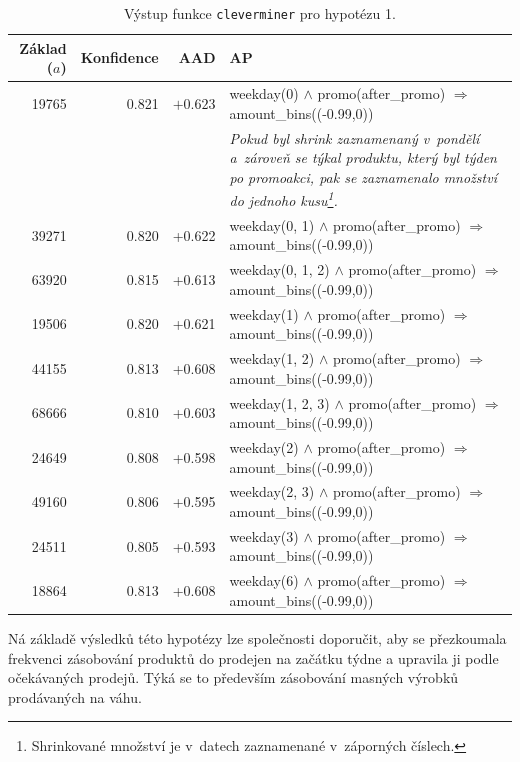     \begin{table}[h!]
        \begin{center}
                \captionsetup{justification=centering}
        \caption{Výstup funkce \texttt{cleverminer} pro hypotézu 1.}
        \begin{tabular}{rrrp{7.5cm}}
            Základ ($a$) & Konfidence & AAD & AP \\
            \midrule
19765 & 0.821 & $+0.623$ & weekday(0) $\land$ promo(after\_promo) $\Rightarrow$ amount\_bins((-0.99,0)) \\
& & & {\footnotesize{\textit{Pokud byl shrink zaznamenaný v~pondělí a~zároveň se týkal produktu, který byl týden po promoakci, pak se zaznamenalo množství do jednoho kusu\footnote{Shrinkované množství je v~datech zaznamenané v~záporných číslech.}. }}} \\
39271 & 0.820 & +0.622 & weekday(0, 1)  $\land$ promo(after\_promo) $\Rightarrow$ amount\_bins((-0.99,0)) \\
63920 & 0.815 & +0.613 & weekday(0, 1, 2)  $\land$ promo(after\_promo) $\Rightarrow$ amount\_bins((-0.99,0)) \\
19506 & 0.820 & +0.621 & weekday(1)  $\land$ promo(after\_promo) $\Rightarrow$ amount\_bins((-0.99,0)) \\
44155 & 0.813 & +0.608 & weekday(1, 2)  $\land$ promo(after\_promo) $\Rightarrow$ amount\_bins((-0.99,0)) \\
68666 & 0.810 & +0.603 & weekday(1, 2, 3)  $\land$ promo(after\_promo) $\Rightarrow$ amount\_bins((-0.99,0)) \\
24649 & 0.808 & +0.598 & weekday(2)  $\land$ promo(after\_promo) $\Rightarrow$ amount\_bins((-0.99,0)) \\
49160 & 0.806 & +0.595 & weekday(2, 3)  $\land$ promo(after\_promo) $\Rightarrow$ amount\_bins((-0.99,0)) \\
24511 & 0.805 & +0.593 &weekday(3) $\land$ promo(after\_promo) $\Rightarrow$ amount\_bins((-0.99,0)) \\
18864 & 0.813 & +0.608 &weekday(6)  $\land$ promo(after\_promo) $\Rightarrow$ amount\_bins((-0.99,0)) \\
    \end{tabular}
\label{tab:H1vysl}
\end{center}
\end{table}

Ná základě výsledků této hypotézy lze společnosti doporučit, aby se přezkoumala frekvenci zásobování produktů do prodejen na začátku týdne a upravila ji podle očekávaných prodejů. Týká se to především zásobování masných výrobků prodávaných na váhu.

